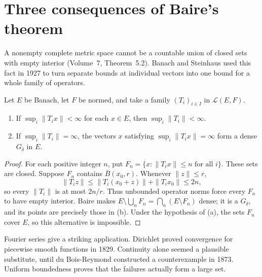 \section{Three consequences of Baire's theorem}

A nonempty complete metric space cannot be a countable union of closed sets with empty interior (Volume~7, Theorem~5.2). Banach and Steinhaus used this fact in 1927 to turn separate bounds at individual vectors into one bound for a whole family of operators.

\begin{theorem}\label{thm:ubp}
Let $E$ be Banach, let $F$ be normed, and take a family $(T_i)_{i\in I}$ in $\mathcal L(E,F)$.
\begin{enumerate}
\item[(a)] If $\sup_i\|T_ix\|<\infty$ for each $x\in E$, then $\sup_i\|T_i\|<\infty$.
\item[(b)] If $\sup_i\|T_i\|=\infty$, the vectors $x$ satisfying $\sup_i\|T_ix\|=\infty$ form a dense $G_\delta$ in $E$.
\end{enumerate}
\end{theorem}
\begin{proof}
For each positive integer $n$, put $F_n=\{x:\|T_ix\|\le n\text{ for all }i\}$. These sets are closed. Suppose $F_n$ contains $\overline B(x_0,r)$. Whenever $\|z\|\le r$,
\[\|T_iz\|\le\|T_i(x_0+z)\|+\|T_ix_0\|\le2n,\]
so every $\|T_i\|$ is at most $2n/r$. Thus unbounded operator norms force every $F_n$ to have empty interior. Baire makes $E\setminus\bigcup_nF_n=\bigcap_n(E\setminus F_n)$ dense; it is a $G_\delta$, and its points are precisely those in (b). Under the hypothesis of (a), the sets $F_n$ cover $E$, so this alternative is impossible.
\end{proof}

Fourier series give a striking application. Dirichlet proved convergence for piecewise smooth functions in 1829. Continuity alone seemed a plausible substitute, until du Bois-Reymond constructed a counterexample in 1873. Uniform boundedness proves that the failures actually form a large set.

